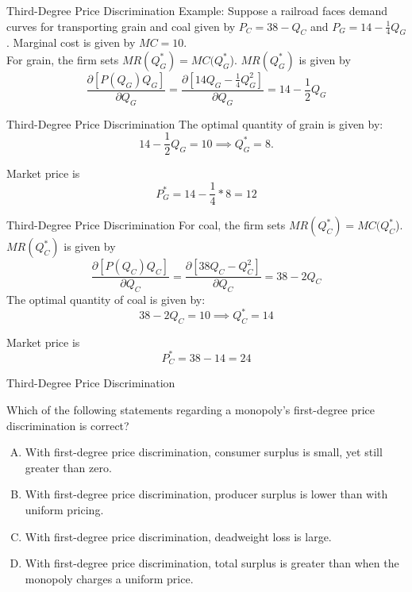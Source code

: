 \documentclass{beamer}
\begin{document}
\begin{frame}{Third-Degree Price Discrimination}
  Example: Suppose a railroad faces demand curves for transporting grain and coal given by $P_C = 38 - Q_C$ and $P_G = 14 - \frac{1}{4} Q_G$. Marginal cost is given by $MC=10$.
  \\

  For grain, the firm sets $MR(Q_G^*) = MC(Q_G^*$). $MR(Q_G^*)$ is given by
  $$
    \frac{\partial [P(Q_G) Q_G]}{\partial Q_G} = \frac{\partial [14 Q_G - \frac{1}{4} Q_G^2]}{\partial Q_G}  = 14 - \frac{1}{2} Q_G
  $$
\end{frame}

\begin{frame}{Third-Degree Price Discrimination}
  The optimal quantity of grain is given by:
  $$
    14 - \frac{1}{2}Q_G = 10 \implies Q_G^* = 8.
  $$

  Market price is
  $$
    P_G^* = 14 - \frac{1}{4} * 8 = 12
  $$
\end{frame}

\begin{frame}{Third-Degree Price Discrimination}
  For coal, the firm sets $MR(Q_C^*) = MC(Q_C^*$). $MR(Q_C^*)$ is given by
  $$
    \frac{\partial [P(Q_C) Q_C]}{\partial Q_C}= \frac{\partial [38Q_C - Q_C^2]}{\partial Q_C} =38-2Q_C
  $$
  The optimal quantity of coal is given by:
  $$
    38 - 2Q_C = 10 \implies Q_C^* = 14
  $$
  
  Market price is
  $$
    P_C^* = 38 - 14 = 24
  $$
\end{frame}

\begin{frame}{Third-Degree Price Discrimination}


  Which of the following statements regarding a monopoly's first-degree price discrimination is correct?

  \begin{enumerate}[A)]
    \item With first-degree price discrimination, consumer surplus is small, yet still greater than zero.
    \item With first-degree price discrimination, producer surplus is lower than with uniform pricing.
    \item With first-degree price discrimination, deadweight loss is large.
    \item With first-degree price discrimination, total surplus is greater than when the monopoly charges a uniform price.
  \end{enumerate}
\end{frame}
\end{document}
